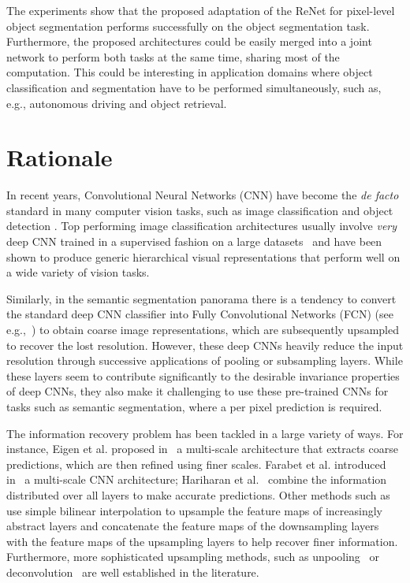 The experiments show that the proposed adaptation of the ReNet for pixel-level
object segmentation performs successfully on the object segmentation task.
Furthermore, the proposed architectures could be easily merged into a joint
network to perform both tasks at the same time, sharing most of the
computation. This could be interesting in application domains where object
classification and segmentation have to be performed simultaneously, such as,
e.g., autonomous driving and object retrieval.


\section{Rationale}\label{sec:reseg_rationale}

In recent years, Convolutional Neural Networks (CNN) have become the {\em de
facto} standard in many computer vision tasks, such as image classification and
object detection \cite{Krizhevsky-2012,Erhan2014}. Top performing image
classification architectures usually involve {\em very} deep CNN trained in a
supervised fashion on a large datasets~\cite{Lin2014,Simonyan2015,
szegedy2014going} and have been shown to produce generic hierarchical visual
representations that perform well on a wide variety of vision tasks.

Similarly, in the semantic segmentation panorama there is a tendency to convert
the standard deep CNN classifier into Fully Convolutional Networks (FCN) (see
e.g.,~\cite{long2014fully,noh2015learning, badrinarayanan2015segnet,
Ronneberger2015}) to obtain coarse image representations, which are
subsequently upsampled to recover the lost resolution. However, these deep CNNs
heavily reduce the input resolution through successive applications of pooling
or subsampling layers. While these layers seem to contribute significantly to
the desirable invariance properties of deep CNNs, they also make it challenging
to use these pre-trained CNNs for tasks such as semantic segmentation, where a
per pixel prediction is required.

The information recovery problem has been tackled in a large variety of ways.
For instance, Eigen et al. proposed in~\cite{Eigen2015} a multi-scale
architecture that extracts coarse predictions, which are then refined using
finer scales. Farabet et al. introduced in~\cite{Farabet:2013} a multi-scale
CNN architecture; Hariharan et al.~\cite{Hariharan2015} combine the information
distributed over all layers to make accurate predictions. Other methods such
as~\cite{long2014fully,badrinarayanan2015segnet} use simple bilinear
interpolation to upsample the feature maps of increasingly abstract layers and
\cite{Ronneberger2015} concatenate the feature maps of the downsampling layers
with the feature maps of the upsampling layers to help recover finer
information. Furthermore, more sophisticated upsampling methods, such as
unpooling~\cite{noh2015learning,badrinarayanan2015segnet} or
deconvolution~\cite{long2014fully} are well established in the literature.

